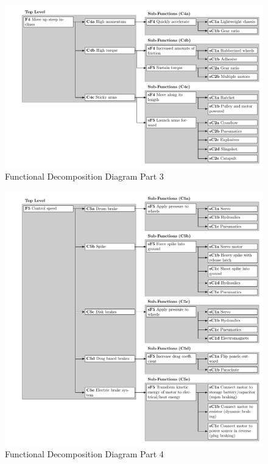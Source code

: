 \documentclass[class=../../report, crop=false]{standalone}
\begin{document}
\begin{figure}[!htb]
	\ContinuedFloat
	\centering
	\includegraphics[width=\textwidth]{../../../bin/funcdecomp-3}
	\caption{Functional Decomposition Diagram Part 3}
\end{figure}
\begin{figure}[!htb]
	\ContinuedFloat
	\centering
	\includegraphics[width=\textwidth]{../../../bin/funcdecomp-4}
	\caption{Functional Decomposition Diagram Part 4}
\end{figure}
\end{document}
